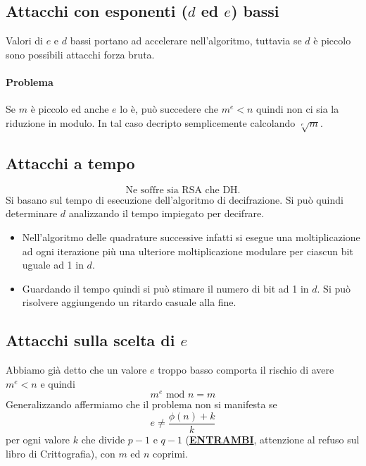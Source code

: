 \subsection{Attacchi con esponenti ($d$ ed $e$) bassi}
Valori di $e$ e $d$ bassi portano ad accelerare nell'algoritmo, tuttavia se $d$ è piccolo sono possibili attacchi forza bruta.
\paragraph{Problema} Se $m$ è piccolo ed anche $e$ lo è, può succedere che $m^e < n$ quindi non ci sia la riduzione in modulo. In tal caso decripto semplicemente calcolando $\sqrt[e]{m}$.

\subsection{Attacchi a tempo}
\[\boxed{\text{Ne soffre sia RSA che DH.}}\]
Si basano sul tempo di esecuzione dell'algoritmo di decifrazione. Si può quindi determinare $d$ analizzando il tempo impiegato per decifrare.
\begin{itemize}
	\item Nell'algoritmo delle quadrature successive infatti si esegue una moltiplicazione ad ogni iterazione più una ulteriore moltiplicazione modulare per ciascun bit uguale ad 1 in $d$.
	\item Guardando il tempo quindi si può stimare il numero di bit ad 1 in $d$.
	Si può risolvere aggiungendo un ritardo casuale alla fine.
\end{itemize}



\subsection{Attacchi sulla scelta di $e$}
Abbiamo già detto che un valore $e$ troppo basso comporta il rischio di avere $m^e < n$ e quindi
$$m^e \text{ mod } n = m$$
Generalizzando affermiamo che il problema non si manifesta se 
$$ e \neq \frac{\phi(n) + k}{k} $$
per ogni valore $k$ che divide $p-1$ e $q-1$ (\textbf{\underline{ENTRAMBI}}, attenzione al refuso sul libro di Crittografia), con $m$ ed $n$ coprimi.

